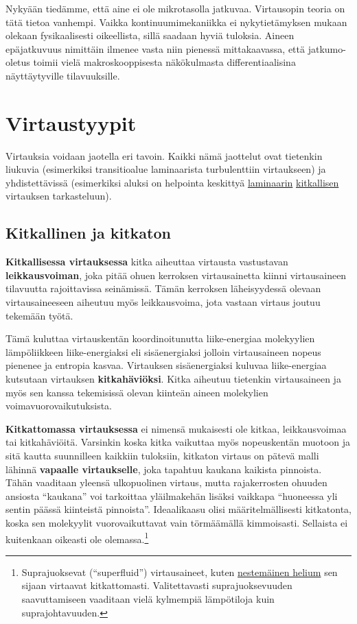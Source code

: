\documentclass[12pt,a4paper,finnish]{book}
\begin{document}
Nykyään tiedämme, että aine ei ole mikrotasolla jatkuvaa. Virtausopin teoria on tätä tietoa vanhempi. 
Vaikka kontinuumimekaniikka ei nykytietämyksen mukaan olekaan fysikaalisesti oikeellista, sillä 
saadaan hyviä tuloksia. Aineen epäjatkuvuus nimittäin ilmenee vasta niin pienessä mittakaavassa, 
että jatkumo-oletus toimii vielä makroskooppisesta näkökulmasta differentiaalisina näyttäytyville 
tilavuuksille.

\chapter{Virtaustyypit}
Virtauksia voidaan jaotella eri tavoin. Kaikki nämä jaottelut ovat tietenkin liukuvia (esimerkiksi 
transitioalue laminaarista turbulenttiin virtaukseen) ja yhdistettävissä (esimerkiksi aluksi on 
helpointa keskittyä \underline{} \underline{laminaarin} 
\underline{} \underline{kitkallisen} virtauksen tarkasteluun).

\section{Kitkallinen ja kitkaton}
\textbf{Kitkallisessa virtauksessa} kitka aiheuttaa virtausta vastustavan \textbf{leikkausvoiman},
joka pitää ohuen kerroksen virtausainetta kiinni virtausaineen tilavuutta rajoittavissa seinämissä. 
Tämän kerroksen läheisyydessä olevaan virtausaineeseen aiheutuu myös leikkausvoima, jota vastaan 
virtaus joutuu tekemään työtä. 

Tämä kuluttaa virtauskentän koordinoitunutta liike-energiaa 
molekyylien lämpöliikkeen liike-energiaksi eli sisäenergiaksi jolloin virtausaineen nopeus 
pienenee ja entropia kasvaa. Virtauksen sisäenergiaksi kuluvaa liike-energiaa kutsutaan virtauksen 
\textbf{kitkahäviöksi}. Kitka aiheutuu tietenkin virtausaineen ja myös sen kanssa tekemisissä olevan 
kiinteän aineen molekylien voimavuorovaikutuksista.

\textbf{Kitkattomassa virtauksessa} ei nimensä mukaisesti ole kitkaa, leikkausvoimaa tai kitkahäviöitä. 
Varsinkin koska kitka vaikuttaa myös nopeuskentän muotoon ja sitä kautta suunnilleen kaikkiin tuloksiin, 
kitkaton virtaus on pätevä malli lähinnä \textbf{vapaalle virtaukselle}, joka tapahtuu kaukana 
kaikista pinnoista. Tähän vaaditaan yleensä ulkopuolinen virtaus, mutta rajakerrosten 
ohuuden ansiosta ``kaukana'' voi tarkoittaa yläilmakehän lisäksi vaikkapa ``huoneessa yli sentin 
päässä kiinteistä pinnoista''. Ideaalikaasu olisi määritelmällisesti kitkatonta,
koska sen molekyylit vuorovaikuttavat vain törmäämällä kimmoisasti. Sellaista ei kuitenkaan oikeasti 
ole olemassa.\footnote{Suprajuoksevat (``superfluid'') virtausaineet, kuten 
\href{http://www.youtube.com/watch?v=2Z6UJbwxBZI}{nestemäinen helium} sen sijaan virtaavat kitkattomasti. 
Valitettavasti suprajuoksevuuden saavuttamiseen vaaditaan vielä kylmempiä lämpötiloja kuin suprajohtavuuden.}
\end{document}
